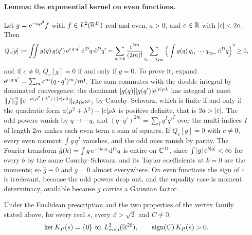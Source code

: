 \paragraph{Lemma: the exponential kernel on even functions.}
Let $g = \mathrm{e}^{- a \rho^2} f$ with $f \in L^2(\mathbb{R}^D)$ real and even, $a > 0$, and $c \in \mathbb{R}$ with ${|c|} < 2 a$.
Then
\begin{equation}
  \label{eq:mom:lemma}
  Q_c[g]
    := \iint g(q) \, g(q') \, \mathrm{e}^{c \, q \cdot q'} \, \mathrm{d}^D q \, \mathrm{d}^D q'
    = \sum_{m \ge 0} \frac{c^{2 m}}{(2 m)!} \sum_{i_1, \ldots, i_{2 m}} \Big( \int g(q) \, q_{i_1} \cdots q_{i_{2 m}} \, \mathrm{d}^D q \Big)^2
    \ge 0,
\end{equation}
and if $c \ne 0$, $Q_c[g] = 0$ if and only if $g = 0$.
To prove it, expand $\mathrm{e}^{c \, q \cdot q'} = \sum_m c^m (q \cdot q')^m / m!$.
The sum commutes with the double integral by dominated convergence: the dominant ${|g(q)|} {|g(q')|} \mathrm{e}^{{|c|} \rho \lambda}$ has integral at most $\|f\|_2^2 \, \|\mathrm{e}^{- a (\rho^2 + \lambda^2) + {|c|} \rho \lambda}\|_{L^2(\mathbb{R}^{2D})}$ by Cauchy--Schwarz, which is finite if and only if the quadratic form $a (\rho^2 + \lambda^2) - {|c|} \rho \lambda$ is positive definite, that is $2 a > {|c|}$.
The odd powers vanish by $q \to - q$, and $(q \cdot q')^{2 m} = \sum_I q^I q'^I$ over the multi-indices $I$ of length $2 m$ makes each even term a sum of squares.
If $Q_c[g] = 0$ with $c \ne 0$, every even moment $\int g \, q^I$ vanishes, and the odd ones vanish by parity.
The Fourier transform $\hat g(k) = \int g \, \mathrm{e}^{- \mathrm{i} k \cdot q} \, \mathrm{d}^D q$ is entire on $\mathbb{C}^D$, since $\int {|g|} \, \mathrm{e}^{b {|q|}} < \infty$ for every $b$ by the same Cauchy--Schwarz, and its Taylor coefficients at $k = 0$ are the moments; so $\hat g \equiv 0$ and $g = 0$ almost everywhere.
On even functions the sign of $c$ is irrelevant, because the odd powers drop out, and the equality case is moment determinacy, available because $g$ carries a Gaussian factor.

\begin{theorem}
  \label{thm:mom:definite}
  Under the Euclidean prescription and the two properties of the vertex family stated above, for every real $s$, every $\beta > \sqrt{2}$ and $C \ne 0$,
  \begin{equation}
    \label{eq:mom:definite}
    \ker K_P(s)
      = \{0\}
    \ \text{on } L^2_{\rm even}(\mathbb{R}^{26}),
    \qquad
    \operatorname{sign}(C) \, K_P(s)
      > 0.
  \end{equation}
\end{theorem}

